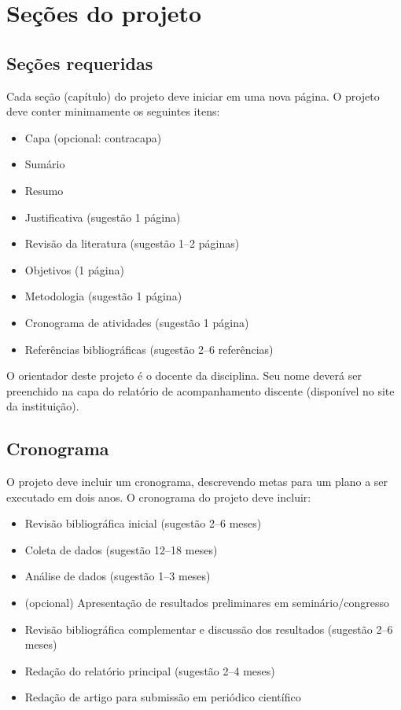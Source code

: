 \documentclass[a4paper]{article}
\begin{document}
\section{Seções do projeto}

\subsection{Seções requeridas}

Cada seção (capítulo) do projeto deve iniciar em uma nova página. O projeto deve
conter minimamente os seguintes itens:

\begin{itemize}
\item Capa (opcional: contracapa)
\item Sumário
\item Resumo
\item Justificativa (sugestão 1 página)
\item Revisão da literatura (sugestão 1--2 páginas)
\item Objetivos (1 página)
\item Metodologia (sugestão 1 página)
\item Cronograma de atividades (sugestão 1 página)
\item Referências bibliográficas (sugestão 2--6 referências)
\end{itemize}

O orientador deste projeto é o docente da disciplina. Seu nome deverá ser
preenchido na capa do relatório de acompanhamento discente (disponível
no site da instituição).

\subsection{Cronograma}

O projeto deve incluir um cronograma, descrevendo metas para um plano
a ser executado em dois anos. O cronograma do projeto deve incluir:

\begin{itemize}
\item Revisão bibliográfica inicial (sugestão 2--6 meses)
\item Coleta de dados (sugestão 12--18 meses)
\item Análise de dados (sugestão 1--3 meses)
\item (opcional) Apresentação de resultados preliminares em
  seminário/congresso
\item Revisão bibliográfica complementar e discussão dos resultados
  (sugestão 2--6 meses)
\item Redação do relatório principal (sugestão 2--4 meses)
\item Redação de artigo para submissão em periódico científico
\end{itemize}
\end{document}
